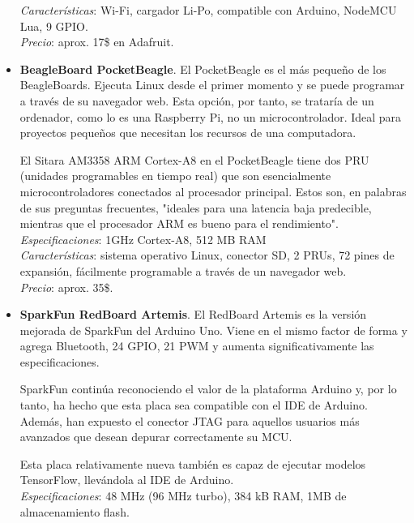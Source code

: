 \documentclass[12pt]{article}
\begin{document}
\begin{itemize}
		\textit{Características}: Wi-Fi, cargador Li-Po, compatible con Arduino, NodeMCU Lua, 9 GPIO.\\
		
		\textit{Precio}: aprox. 17\$ en Adafruit.\\
		
		\item \textbf{BeagleBoard PocketBeagle}. El PocketBeagle es el más pequeño de los BeagleBoards. Ejecuta Linux desde el primer momento y se puede programar a través de su navegador web. Esta opción, por tanto, se trataría de un ordenador, como lo es una Raspberry Pi, no un microcontrolador. Ideal para proyectos pequeños que necesitan los recursos de una computadora. 
		
		El Sitara AM3358 ARM Cortex-A8 en el PocketBeagle tiene dos PRU (unidades programables en tiempo real) que son esencialmente microcontroladores conectados al procesador principal. Estos son, en palabras de sus preguntas frecuentes, "ideales para una latencia baja predecible, mientras que el procesador ARM es bueno para el rendimiento". \\
		
		\textit{Especificaciones}: 1GHz Cortex-A8, 512 MB RAM\\
		
		\textit{Características}: sistema operativo Linux, conector SD, 2 PRUs, 72 pines de expansión, fácilmente programable a través de un navegador web.\\
		
		\textit{Precio}: aprox. 35\$. \\
		
		\item \textbf{SparkFun RedBoard Artemis}. El RedBoard Artemis es la versión mejorada de SparkFun del Arduino Uno. Viene en el mismo factor de forma y agrega Bluetooth, 24 GPIO, 21 PWM y aumenta significativamente las especificaciones.
		
		SparkFun continúa reconociendo el valor de la plataforma Arduino y, por lo tanto, ha hecho que esta placa sea compatible con el IDE de Arduino. Además, han expuesto el conector JTAG para aquellos usuarios más avanzados que desean depurar correctamente su MCU.
		
		Esta placa relativamente nueva también es capaz de ejecutar modelos TensorFlow, llevándola al IDE de Arduino.  \\
		
		\textit{Especificaciones}: 48 MHz (96 MHz turbo), 384 kB RAM, 1MB de almacenamiento flash. \\
		

\end{itemize}
\end{document}
